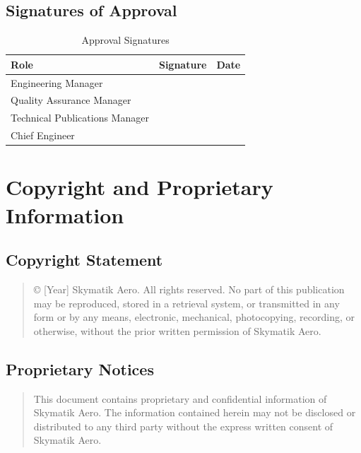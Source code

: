 \documentclass[12pt,a4paper,twoside,openright]{book}
\newcommand{\tabletextfont}{\normalfont\rmfamily}
\newcommand{\tableheadfont}{\normalfont\bfseries}
\begin{document}
\vspace{1cm}
\subsection{Signatures of Approval}

\begin{table}[h]
\centering
\setlength{\tabcolsep}{5pt} %
\begin{tabular}{|p{}|p{}|p{}|}
\hline
\tableheadfont\textbf{Role} & \tableheadfont\textbf{Signature} & \tableheadfont\textbf{Date} \\
\hline
\tabletextfont Engineering Manager & & \\
\hline
\tabletextfont Quality Assurance Manager & & \\
\hline
\tabletextfont Technical Publications Manager & & \\
\hline
\tabletextfont Chief Engineer & & \\
\hline
\end{tabular}
\caption{Approval Signatures}
\end{table}

\section{Copyright and Proprietary Information}

\subsection{Copyright Statement}

\begin{quote}
© {\color{missingred}[Year]} Skymatik Aero. All rights reserved. No part of this publication may be reproduced, stored in a retrieval system, or transmitted in any form or by any means, electronic, mechanical, photocopying, recording, or otherwise, without the prior written permission of Skymatik Aero.
\end{quote}

\subsection{Proprietary Notices}

\begin{quote}
This document contains proprietary and confidential information of Skymatik Aero. The information contained herein may not be disclosed or distributed to any third party without the express written consent of Skymatik Aero.
\end{quote}
\end{document}

